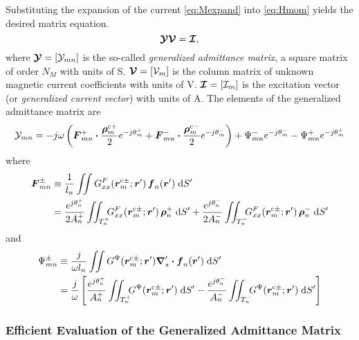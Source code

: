 Substituting the expansion of the current \eqref{eq:Mexpand} into \eqref{eq:Hmom}
yields the desired matrix equation.
\begin{equation}
  \boldsymbol{\mathcal{Y}} \boldsymbol{\mathcal{V}} =  \boldsymbol{\mathcal{I}},  \label{eq:Hmatrix}
\end{equation}
where $\boldsymbol{\mathcal{Y}} = [\mathcal{Y}_{mn}]$ is the so-called {\em generalized admittance
matrix}, a square matrix of order $N_M$ with units of \si{S}.  
$\boldsymbol{\mathcal{V}} = [\mathcal{V}_m]$ is the column matrix of unknown magnetic current
coefficients with units of \si{V}. 
$\boldsymbol{\mathcal{I}}= [\mathcal{I}_m]$ is the excitation vector (or {\em generalized
current vector}) with units of \si{A}.
 The elements of the generalized admittance matrix are
\begin{equation}
  \mathcal{Y}_{mn} = 
 -j\omega \left(
    \boldsymbol{F}_{mn}^+ \boldsymbol{\cdot} \frac{\boldsymbol{\rho}^{\text{c}+}_m}{2} e^{-j\theta_m^+}
    +
    \boldsymbol{F}_{mn}^- \boldsymbol{\cdot} \frac{\boldsymbol{\rho}^{\text{c}-}_m}{2} e^{-j\theta_m^-}
  \right)
  + \Psi_{mn}^- e^{-j\theta_m^-} - \Psi_{mn}^+ e^{-j\theta_m^+}
\end{equation}
where
 \begin{align}
   \boldsymbol{F}_{mn}^{\pm} & \equiv 
   \frac{1}{l_n} \iint  
   G^F_{xx}(\boldsymbol{r}^{\text{c}\pm}_m;\boldsymbol{r}') \, \boldsymbol{f}_n(\boldsymbol{r}') \; \text{d} S'  \notag \\
   &= 
     \frac{e^{j\theta_n^+}}{2A_n^+} \iint_{T_n^+}  \!\!\!
     G^F_{xx}(\boldsymbol{r}^{\text{c}\pm}_m;\boldsymbol{r}') \, \boldsymbol{\rho}_n^+ \; \text{d} S'
     +
     \frac{e^{j\theta_n^-}}{2A_n^-} \iint_{T_n^-}  \!\!\!
     G^F_{xx}(\boldsymbol{r}^{\text{c}\pm}_m;\boldsymbol{r}')  \, \boldsymbol{\rho}_n^- \; \text{d} S'
     \label{eq:Fmnpm}
 \end{align}
and
\begin{align}
  \Psi_{mn}^{\pm} &\equiv \frac{j}{\omega l_n} \iint
  {G}^{\Psi}(\boldsymbol{r}^{\text{c}\pm}_m;\boldsymbol{r}')
  \boldsymbol{\nabla}'_s \boldsymbol{\cdot} \boldsymbol{f}_n(\boldsymbol{r}')  
  \; \text{d} S'
  \notag \\
  &= \frac{j}{\omega}
  \left[
    \frac{e^{j\theta_n^+}}{A_n^+} \iint_{T_n^+}  \!\!\!
    {G}^{\Psi}(\boldsymbol{r}^{\text{c}\pm}_m;\boldsymbol{r}') \; \text{d} S'
    -
    \frac{e^{j\theta_n^-}}{A_n^-} \iint_{T_n^-}{}  \!\!\!
    {G}^{\Psi}(\boldsymbol{r}^{\text{c}\pm}_m;\boldsymbol{r}') \; \text{d} S'
  \right]    \label{eq:Psimnpm}
\end{align}

\subsubsection{Efficient Evaluation of the Generalized Admittance Matrix}
